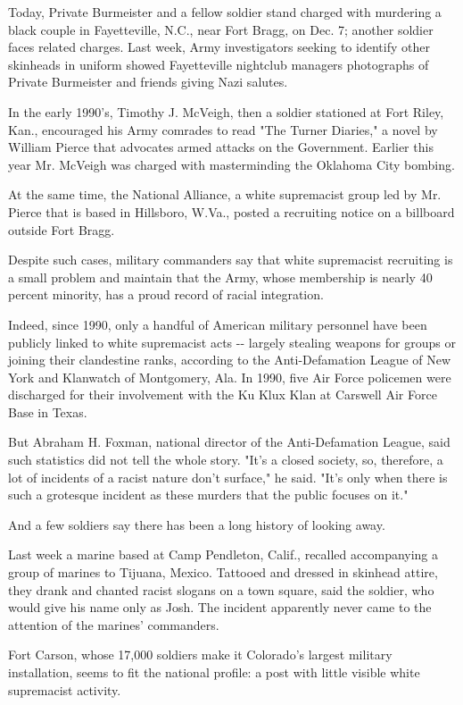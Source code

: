 Today, Private Burmeister and a fellow soldier stand charged with
murdering a black couple in Fayetteville, N.C., near Fort Bragg, on Dec.
7; another soldier faces related charges. Last week, Army investigators
seeking to identify other skinheads in uniform showed Fayetteville
nightclub managers photographs of Private Burmeister and friends giving
Nazi salutes.

In the early 1990's, Timothy J. McVeigh, then a soldier stationed at
Fort Riley, Kan., encouraged his Army comrades to read "The Turner
Diaries," a novel by William Pierce that advocates armed attacks on the
Government. Earlier this year Mr. McVeigh was charged with masterminding
the Oklahoma City bombing.

At the same time, the National Alliance, a white supremacist group led
by Mr. Pierce that is based in Hillsboro, W.Va., posted a recruiting
notice on a billboard outside Fort Bragg.

Despite such cases, military commanders say that white supremacist
recruiting is a small problem and maintain that the Army, whose
membership is nearly 40 percent minority, has a proud record of racial
integration.

Indeed, since 1990, only a handful of American military personnel have
been publicly linked to white supremacist acts -\/- largely stealing
weapons for groups or joining their clandestine ranks, according to the
Anti-Defamation League of New York and Klanwatch of Montgomery, Ala. In
1990, five Air Force policemen were discharged for their involvement
with the Ku Klux Klan at Carswell Air Force Base in Texas.

But Abraham H. Foxman, national director of the Anti-Defamation League,
said such statistics did not tell the whole story. "It's a closed
society, so, therefore, a lot of incidents of a racist nature don't
surface," he said. "It's only when there is such a grotesque incident as
these murders that the public focuses on it."

And a few soldiers say there has been a long history of looking away.

Last week a marine based at Camp Pendleton, Calif., recalled
accompanying a group of marines to Tijuana, Mexico. Tattooed and dressed
in skinhead attire, they drank and chanted racist slogans on a town
square, said the soldier, who would give his name only as Josh. The
incident apparently never came to the attention of the marines'
commanders.

Fort Carson, whose 17,000 soldiers make it Colorado's largest military
installation, seems to fit the national profile: a post with little
visible white supremacist activity.


